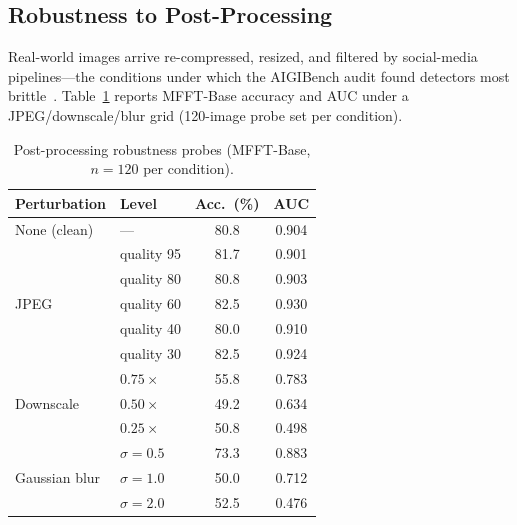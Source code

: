 \documentclass[journal]{IEEEtran}
\begin{document}
\subsection{Robustness to Post-Processing}
\label{sec:robustness}
Real-world images arrive re-compressed, resized, and filtered by social-media pipelines---the conditions under which the AIGIBench audit found detectors most brittle~\cite{li2025aigibench}. Table~\ref{tab:robustness} reports MFFT-Base accuracy and AUC under a JPEG/downscale/blur grid (120-image probe set per condition).

\begin{table}[!t]
\renewcommand{\arraystretch}{1.2}
\caption{Post-processing robustness probes (MFFT-Base, $n{=}120$ per condition).}
\label{tab:robustness}
\centering
\setlength{\tabcolsep}{4pt}
\begin{tabular}{llcc}
\toprule
Perturbation & Level & Acc.\ (\%) & AUC \\
\midrule
None (clean)  & ---        & 80.8 & 0.904 \\
\midrule
\multirow{5}{*}{JPEG}
 & quality 95 & 81.7 & 0.901 \\
 & quality 80 & 80.8 & 0.903 \\
 & quality 60 & 82.5 & 0.930 \\
 & quality 40 & 80.0 & 0.910 \\
 & quality 30 & 82.5 & 0.924 \\
\midrule
\multirow{3}{*}{Downscale}
 & $0.75\times$ & 55.8 & 0.783 \\
 & $0.50\times$ & 49.2 & 0.634 \\
 & $0.25\times$ & 50.8 & 0.498 \\
\midrule
\multirow{3}{*}{Gaussian blur}
 & $\sigma = 0.5$ & 73.3 & 0.883 \\
 & $\sigma = 1.0$ & 50.0 & 0.712 \\
 & $\sigma = 2.0$ & 52.5 & 0.476 \\
\bottomrule
\end{tabular}
\end{table}
\end{document}
